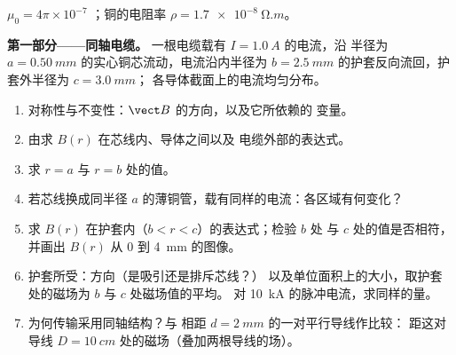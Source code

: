 \begin{problem}
\label{pb:b1:magnetostatics:1}
$\mu_0 = 4\pi \times 10^{-7}$ ；铜的电阻率 $\rho = \qty{1.7e-8}{\ohm.m}$。

\medskip
\noindent\textbf{第一部分——同轴电缆。}
一根电缆载有 $I = \qty{1.0}{A}$ 的电流，沿
半径为 $a = \qty{0.50}{mm}$ 的实心铜芯流动，电流沿内半径为 $b =
\qty{2.5}{mm}$ 的护套反向流回，护套外半径为 $c = \qty{3.0}{mm}$；
各导体截面上的电流均匀分布。
\begin{enumerate}
  \item 对称性与不变性：$\vect B$ 的方向，以及它所依赖的
        变量。
  \item 由求 $B(r)$ 在芯线内、导体之间以及
        电缆外部的表达式。
  \item 求 $r = a$ 与 $r = b$ 处的值。
  \item 若芯线换成同半径
        $a$ 的薄铜管，载有同样的电流：各区域有何变化？
  \item 求 $B(r)$ 在护套内（$b < r < c$）的表达式；检验 $b$ 处
        与 $c$ 处的值是否相符，并画出 $B(r)$ 从 $0$ 到 \qty{4}{mm} 的图像。
  \item 护套所受：方向（是吸引还是排斥芯线？）
        以及单位面积上的大小，取护套处的磁场为
        $b$ 与 $c$ 处磁场值的平均。
        对 \qty{10}{kA} 的脉冲电流，求同样的量。
  \item 为何传输采用同轴结构？与
        相距 $d = \qty{2}{mm}$ 的一对平行导线作比较：
        距这对导线 $D = \qty{10}{cm}$ 处的磁场（叠加两根导线的场）。
\end{enumerate}


\end{problem}
